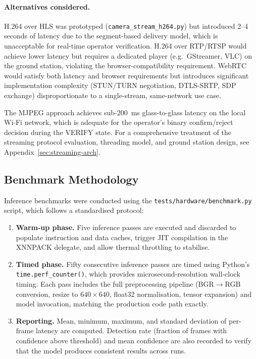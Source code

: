 \paragraph{Alternatives considered.}
H.264 over HLS was prototyped (\texttt{camera\_stream\_h264.py}) but introduced 2--4 seconds of latency due to the segment-based delivery model, which is unacceptable for real-time operator verification.  H.264 over RTP/RTSP would achieve lower latency but requires a dedicated player (e.g.\ GStreamer, VLC) on the ground station, violating the browser-compatibility requirement.  WebRTC would satisfy both latency and browser requirements but introduces significant implementation complexity (STUN/TURN negotiation, DTLS-SRTP, SDP exchange) disproportionate to a single-stream, same-network use case.

The MJPEG approach achieves sub-\SI{200}{\milli\second} glass-to-glass latency on the local Wi-Fi network, which is adequate for the operator's binary confirm/reject decision during the VERIFY state.  For a comprehensive treatment of the streaming protocol evaluation, threading model, and ground station design, see Appendix~\ref{sec:streaming-arch}.

\subsection{Benchmark Methodology}\label{sec:cv:inference:method}

Inference benchmarks were conducted using the \texttt{tests/hardware/benchmark.py} script, which follows a standardised protocol:

\begin{enumerate}
  \item \textbf{Warm-up phase.}  Five inference passes are executed and discarded to populate instruction and data caches, trigger JIT compilation in the XNNPACK delegate, and allow thermal throttling to stabilise.

  \item \textbf{Timed phase.}  Fifty consecutive inference passes are timed using Python's \texttt{time.perf\_counter()}, which provides microsecond-resolution wall-clock timing.  Each pass includes the full preprocessing pipeline (BGR$\rightarrow$RGB conversion, resize to $640\times640$, float32 normalisation, tensor expansion) and model invocation, matching the production code path exactly.

  \item \textbf{Reporting.}  Mean, minimum, maximum, and standard deviation of per-frame latency are computed.  Detection rate (fraction of frames with confidence above threshold) and mean confidence are also recorded to verify that the model produces consistent results across runs.
\end{enumerate}

